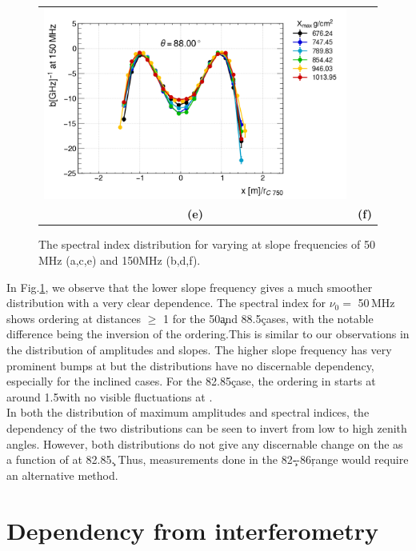 \begin{figure}[th!]
\begin{tabular}{cc}
    \includegraphics[width=0.45\linewidth]{spec_Indx88_150.png}  \\
\textbf{(e)} & \textbf{(f)} \\
\end{tabular}
\caption{The spectral index distribution for varying \xmax at slope frequencies of 50 MHz (a,c,e) and 150MHz (b,d,f).}
\label{fig:indx_dist}
\end{figure}
In Fig.\ref{fig:indx_dist}, we observe that the lower slope frequency gives a much smoother distribution with a very clear \xmax dependence. The spectral index for $\nu_0=$ 50\,MHz shows \xmax ordering at distances $\ge$ 1 \rc for the 50\c and 88.5\c cases, with the notable difference being the inversion of the \xmax ordering.This is similar to our observations in the distribution of amplitudes and slopes. The higher slope frequency has very prominent bumps at \rc but the distributions have no discernable \xmax dependency, especially for the inclined cases. For the 82.85\c case, the ordering in \xmax starts at around 1.5\rc with no visible fluctuations at \rc.
\\In both the distribution of maximum amplitudes and spectral indices, the \xmax dependency of the two distributions can be seen to invert from low to high zenith angles. However, both distributions do not give any discernable change on the \rc as a function of \xmax at 82.85\c. Thus, \xmax measurements done in the 82\c--86\c range would require an alternative method.
 
\section{\xmax Dependency from interferometry}\label{sec:rit}

